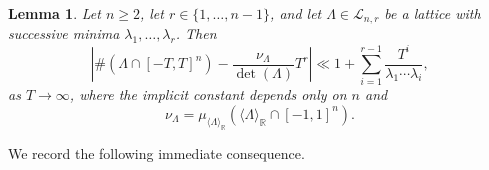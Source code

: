\documentclass[11pt,reqno]{amsart}
\newtheorem{lem}[thm]{Lemma}
\theoremstyle{definition}
\theoremstyle{remark}
\numberwithin{equation}{section}
\numberwithin{thm}{section}
\numberwithin{table}{section}
\def \R {{\mathbb R}}
\begin{document}
    \begin{lem}\label{lem:generalboundlatticesuccessiveminima}
          Let $n \ge 2$, let $r \in \{ 1, \ldots, n-1\}$, and let $\Lambda \in \mathcal{L}_{n,r}$ be a lattice with successive minima $\lambda_1, \ldots, \lambda_r$. 
          Then 
              \begin{equation*}
     \left|
            \# (\Lambda \cap [-T,T]^n) - \frac{\nu_\Lambda}{\det(\Lambda)} T^{r}
            \right| \ll  1+ \sum_{i=1}^{r-1} \frac{T^{i}}{\lambda_1 \cdots \lambda_{i}},
              \end{equation*}
           as $T \to \infty$, 
          where
                  the implicit constant depends only on $n$  and
\begin{equation}\label{eq:villach}
\nu_\Lambda = \mu_{  \langle \Lambda\rangle_\R}(
        \langle \Lambda\rangle_\R \cap [-1,1]^n).
\end{equation}
       \end{lem}

We record the following immediate consequence.
\end{document}
